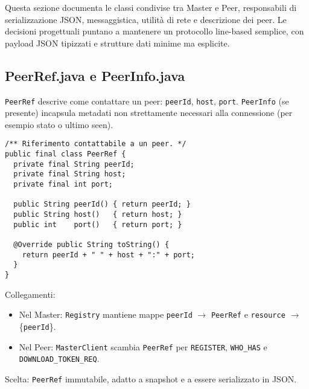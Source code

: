 \documentclass[a4paper,12pt]{article}
\begin{document}
Questa sezione documenta le classi condivise tra Master e Peer, responsabili di serializzazione JSON, messaggistica, utilità di rete e descrizione dei peer. Le decisioni progettuali puntano a mantenere un protocollo line-based semplice, con payload JSON tipizzati e strutture dati minime ma esplicite.

\subsection*{PeerRef.java e PeerInfo.java}
\texttt{PeerRef} descrive come contattare un peer: \texttt{peerId}, \texttt{host}, \texttt{port}. \texttt{PeerInfo} (se presente) incapsula metadati non strettamente necessari alla connessione (per esempio stato o ultimo seen).
\begin{lstlisting}
/** Riferimento contattabile a un peer. */
public final class PeerRef {
  private final String peerId;
  private final String host;
  private final int port;

  public String peerId() { return peerId; }
  public String host()   { return host; }
  public int    port()   { return port; }

  @Override public String toString() {
    return peerId + " " + host + ":" + port;
  }
}
\end{lstlisting}
Collegamenti:
\begin{itemize}[nosep]
  \item Nel Master: \texttt{Registry} mantiene mappe \texttt{peerId} $\rightarrow$ \texttt{PeerRef} e \texttt{resource} $\rightarrow$ \{\texttt{peerId}\}.
  \item Nel Peer: \texttt{MasterClient} scambia \texttt{PeerRef} per \texttt{REGISTER}, \texttt{WHO\_HAS} e \texttt{DOWNLOAD\_TOKEN\_REQ}.
\end{itemize}
Scelta: \texttt{PeerRef} immutabile, adatto a snapshot e a essere serializzato in JSON.
\end{document}
